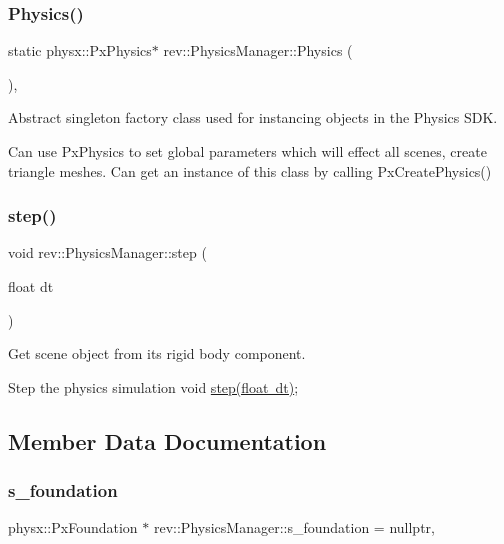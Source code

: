 \subsubsection{\texorpdfstring{Physics()}{Physics()}}
{\footnotesize\ttfamily static physx\+::\+Px\+Physics$\ast$ rev\+::\+Physics\+Manager\+::\+Physics (\begin{DoxyParamCaption}{ }\end{DoxyParamCaption})\hspace{0.3cm}{\ttfamily [inline]}, {\ttfamily [static]}}



Abstract singleton factory class used for instancing objects in the Physics S\+DK. 

Can use Px\+Physics to set global parameters which will effect all scenes, create triangle meshes. Can get an instance of this class by calling Px\+Create\+Physics() \mbox{\label{classrev_1_1_physics_manager_a9da09ceba8ff4b0f44821e7c4b43acf4}} 
\subsubsection{\texorpdfstring{step()}{step()}}
{\footnotesize\ttfamily void rev\+::\+Physics\+Manager\+::step (\begin{DoxyParamCaption}\item[{float}]{dt }\end{DoxyParamCaption})}



Get scene object from its rigid body component. 

Step the physics simulation void \mbox{\hyperlink{classrev_1_1_physics_manager_a9da09ceba8ff4b0f44821e7c4b43acf4}{step(float dt)}}; 

\subsection{Member Data Documentation}
\mbox{\label{classrev_1_1_physics_manager_a88bf72ece5164ece7c4e3705e9eb2915}} 
\subsubsection{\texorpdfstring{s\_foundation}{s\_foundation}}
{\footnotesize\ttfamily physx\+::\+Px\+Foundation $\ast$ rev\+::\+Physics\+Manager\+::s\+\_\+foundation = nullptr\hspace{0.3cm}{\ttfamily [static]}, {\ttfamily [protected]}}



